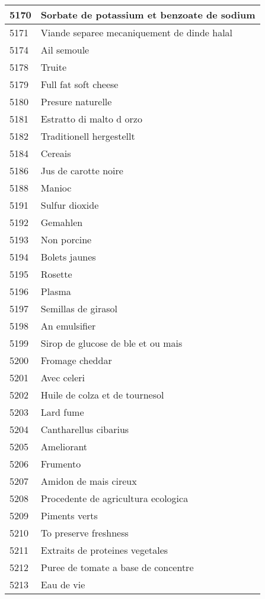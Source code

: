 \begin{longtable}{|l|l|}
5170 & Sorbate de potassium et benzoate de sodium \\ \hline 
5171 & Viande separee mecaniquement de dinde halal \\ \hline 
5174 & Ail semoule \\ \hline 
5178 & Truite \\ \hline 
5179 & Full fat soft cheese \\ \hline 
5180 & Presure naturelle \\ \hline 
5181 & Estratto di malto d orzo \\ \hline 
5182 & Traditionell hergestellt \\ \hline 
5184 & Cereais \\ \hline 
5186 & Jus de carotte noire \\ \hline 
5188 & Manioc \\ \hline 
5191 & Sulfur dioxide \\ \hline 
5192 & Gemahlen \\ \hline 
5193 & Non porcine \\ \hline 
5194 & Bolets jaunes \\ \hline 
5195 & Rosette \\ \hline 
5196 & Plasma \\ \hline 
5197 & Semillas de girasol \\ \hline 
5198 & An emulsifier \\ \hline 
5199 & Sirop de glucose de ble et ou mais \\ \hline 
5200 & Fromage cheddar \\ \hline 
5201 & Avec celeri \\ \hline 
5202 & Huile de colza et de tournesol \\ \hline 
5203 & Lard fume \\ \hline 
5204 & Cantharellus cibarius \\ \hline 
5205 & Ameliorant \\ \hline 
5206 & Frumento \\ \hline 
5207 & Amidon de mais cireux \\ \hline 
5208 & Procedente de agricultura ecologica \\ \hline 
5209 & Piments verts \\ \hline 
5210 & To preserve freshness \\ \hline 
5211 & Extraits de proteines vegetales \\ \hline 
5212 & Puree de tomate a base de concentre \\ \hline 
5213 & Eau de vie \\ \hline 

\end{longtable}
